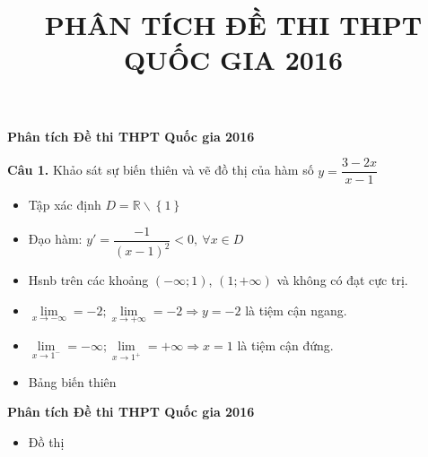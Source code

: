 \documentclass[11pt]{beamer} %
\title[\textcolor{white}{Ôn thi THPT Quốc Gia 2016}]{\LARGE \textbf{PHÂN TÍCH ĐỀ THI THPT\\ QUỐC GIA 2016}}
\author[Tăng Lâm Tường Vinh (Môn Toán)]{} %
\date{}
\newcommand{\cau}[2]{\begin{block}{}
		{\color{red}\textbf{Câu #1.}} #2
	\end{block}
}
\begin{document}
\begin{frame}
\titlepage %
\end{frame}
\begin{frame}{\textbf{\qquad Phân tích Đề thi THPT Quốc gia 2016}}~\\[-15pt]
\cau{1}{Khảo sát sự biến thiên và vẽ đồ thị của hàm số $y=\dfrac{3-2x}{x-1}$}\pause
\begin{itemize}
	\item Tập xác định $D=\mathbb{R} \backslash \left\{ 1 \right\}$
	\item Đạo hàm: $y'=\dfrac{-1}{(x-1)^2}<0,~\forall x\in D$
	\item Hsnb trên các khoảng $(-\infty;1)$, $(1;+\infty)$ và không có đạt cực trị.		
	\item $\lim\limits_{x\rightarrow -\infty} =-2;  \lim\limits_{x\rightarrow +\infty} =-2\Rightarrow y=-2$ là tiệm cận ngang.
	\item $\lim\limits_{x\rightarrow 1^-} =-\infty; \lim\limits_{x\rightarrow 1^+} =+\infty\Rightarrow x=1$ là tiệm cận đứng.		
	\item Bảng biến thiên
	\begin{center}
		
	\end{center}
\end{itemize}
\end{frame}

\begin{frame}{\textbf{\qquad Phân tích Đề thi THPT Quốc gia 2016}}~\\[-20pt]
	\begin{itemize}
		\item Đồ thị\pause
		\begin{center}
			
		\end{center}
	\end{itemize}
\end{frame}
\end{document}
